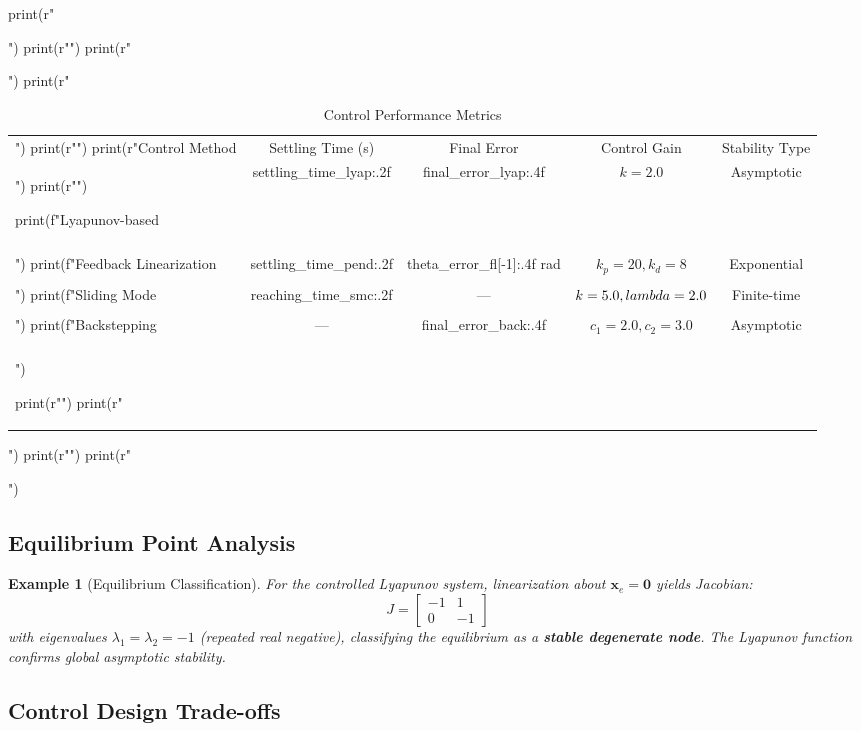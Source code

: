 \documentclass[a4paper, 11pt]{article}
\newtheorem{example}{Example}[section]
\begin{document}
\begin{pycode}
print(r"\begin{table}[htbp]")
print(r"\centering")
print(r"\caption{Control Performance Metrics}")
print(r"\begin{tabular}{lcccc}")
print(r"\toprule")
print(r"Control Method & Settling Time (s) & Final Error & Control Gain & Stability Type \\")
print(r"\midrule")

print(f"Lyapunov-based & {settling_time_lyap:.2f} & {final_error_lyap:.4f} & $k = 2.0$ & Asymptotic \\\\")
print(f"Feedback Linearization & {settling_time_pend:.2f} & {theta_error_fl[-1]:.4f} rad & $k_p = 20, k_d = 8$ & Exponential \\\\")
print(f"Sliding Mode & {reaching_time_smc:.2f} & --- & $k = 5.0, \\lambda = 2.0$ & Finite-time \\\\")
print(f"Backstepping & --- & {final_error_back:.4f} & $c_1 = 2.0, c_2 = 3.0$ & Asymptotic \\\\")

print(r"\bottomrule")
print(r"\end{tabular}")
print(r"\label{tab:performance}")
print(r"\end{table}")
\end{pycode}

\subsection{Equilibrium Point Analysis}

\begin{example}[Equilibrium Classification]
For the controlled Lyapunov system, linearization about $\mathbf{x}_e = \mathbf{0}$ yields Jacobian:
\begin{equation}
J = \begin{bmatrix} -1 & 1 \\ 0 & -1 \end{bmatrix}
\end{equation}
with eigenvalues $\lambda_1 = \lambda_2 = -1$ (repeated real negative), classifying the equilibrium
as a \textbf{stable degenerate node}. The Lyapunov function confirms global asymptotic stability.
\end{example}

\subsection{Control Design Trade-offs}
\end{document}
